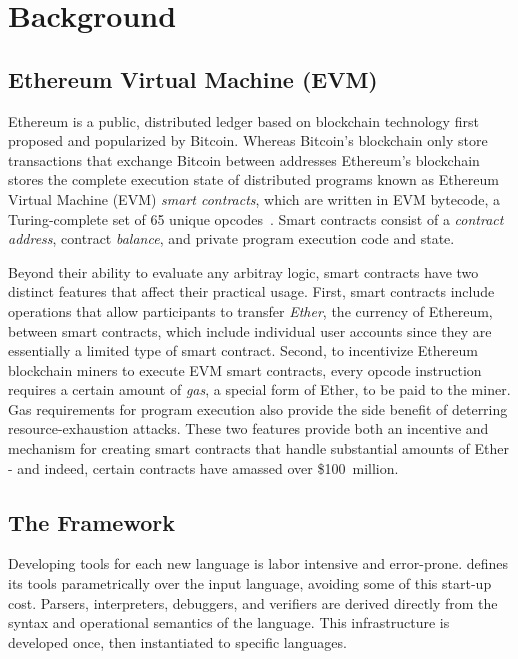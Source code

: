 \section{Background}

\subsection{Ethereum Virtual Machine (EVM)}

Ethereum is a public, distributed ledger based on blockchain technology first
proposed and popularized by Bitcoin. Whereas Bitcoin's blockchain only store
transactions that exchange Bitcoin between addresses Ethereum's blockchain
stores the complete execution state of distributed programs known as Ethereum
Virtual Machine (EVM) \textit{smart contracts}, which are written in EVM
bytecode, a Turing-complete set of 65 unique opcodes~\cite{yellowpaper}. Smart
contracts consist of a \textit{contract address}, contract \textit{balance}, and
private program execution code and state.

Beyond their ability to evaluate any arbitray logic, smart contracts have two
distinct features that affect their practical usage. First, smart contracts
include operations that allow participants to transfer \textit{Ether}, the
currency of Ethereum, between smart contracts, which include individual user
accounts since they are essentially a limited type of smart contract. Second, to
incentivize Ethereum blockchain miners to execute EVM smart contracts, every
opcode instruction requires a certain amount of \textit{gas}, a special form of
Ether, to be paid to the miner. Gas requirements for program execution also
provide the side benefit of deterring resource-exhaustion attacks. These two
features provide both an incentive and mechanism for creating smart contracts
that handle substantial amounts of Ether - and indeed, certain contracts have
amassed over \$100~million.

\subsection{The \K{} Framework}

Developing tools for each new language is labor intensive and error-prone. \K{}
defines its tools parametrically over the input language, avoiding some of this
start-up cost. Parsers, interpreters, debuggers, and verifiers are derived
directly from the syntax and operational semantics of the language. This
infrastructure is developed once, then instantiated to specific
languages.~\cite{stefanescu-park-yuwen-li-rosu-2016-oopsla}

